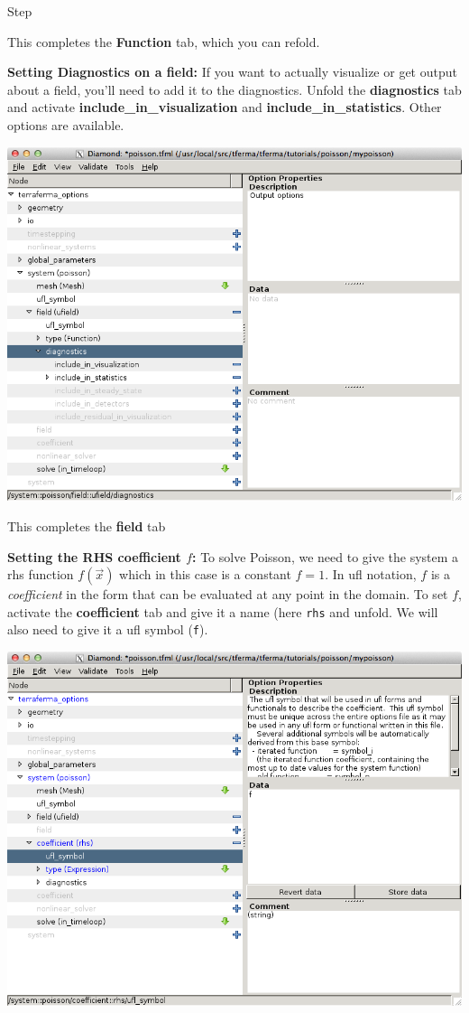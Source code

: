 \begin{steps}{Step}
\begin{center}
\end{center}
This completes the \textbf{Function} tab, which you can refold.
\item \textbf{Setting Diagnostics on a field:}  If you want to actually visualize
  or get output about a field, you'll need to add it to the
  diagnostics.  Unfold the \textbf{diagnostics} tab and activate
  \textbf{include\_in\_visualization} and
  \textbf{include\_in\_statistics}. Other options are available.
\begin{center}
    \includegraphics[width=\diamondwidth]{figures/screendumps/diamond_poisson_09.png}
\end{center}
This completes the \textbf{field} tab
\item \textbf{Setting the RHS coefficient $f$:} To solve Poisson, we
  need to give the system a rhs function $f(\vec{x})$ which in this
  case is a constant $f=1$.  In ufl notation,  $f$ is a
  \emph{coefficient} in the form that can be evaluated at any point in
  the domain.  To set $f$, activate the \textbf{coefficient} tab and
  give it a name (here \texttt{rhs} and unfold. We will also need to
  give it a  ufl symbol (\texttt{f}). 
\begin{center}
    \includegraphics[width=\diamondwidth]{figures/screendumps/diamond_poisson_10b.png}

\end{center}
\end{steps}
